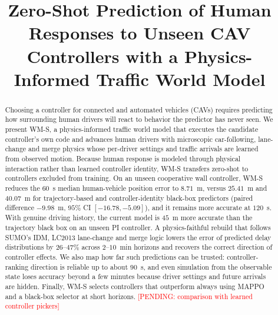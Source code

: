 \documentclass[conference]{IEEEtran}
\title{Zero-Shot Prediction of Human Responses to Unseen CAV Controllers with a Physics-Informed Traffic World Model}
\author{\IEEEauthorblockN{Author names to be supplied}
\IEEEauthorblockA{Affiliations and contact details to be supplied}}
\newcommand{\pending}[1]{\textcolor{red}{[PENDING: #1]}}
\begin{document}
\maketitle
\nocite{liu_physics_wm,sheng_residual,treiber_idm,kesting_mobil,hu_gaia1,gulino_waymax,salzmann_trajectronpp,oefinger_admissibility,rahmani_survey,lopez_sumo,yu_mappo}

\begin{abstract}
Choosing a controller for connected and automated vehicles (CAVs) requires predicting how surrounding human drivers will react to behavior the predictor has never seen. We present WM-S, a physics-informed traffic world model that executes the candidate controller's own code and advances human drivers with microscopic car-following, lane-change and merge physics whose per-driver settings and traffic arrivals are learned from observed motion. Because human response is modeled through physical interaction rather than learned controller identity, WM-S transfers zero-shot to controllers excluded from training.
On an unseen cooperative wall controller, WM-S reduces the $60$~s median human-vehicle position error to $8.71$~m, versus $25.41$~m and $40.07$~m for trajectory-based and controller-identity black-box predictors (paired difference $-9.98$~m, $95\%$ CI $[-16.78,-5.09]$), and it remains more accurate at $120$~s. %
With genuine driving history, the current model is $45$~m more accurate than the trajectory black box on an unseen PI controller. %
A physics-faithful rebuild that follows SUMO's IDM, LC2013 lane-change and merge logic lowers the error of predicted delay distributions by $26$--$47\%$ across $2$--$10$~min horizons and recovers the correct direction of controller effects. %
We also map how far such predictions can be trusted: controller-ranking direction is reliable up to about $90$~s, and even simulation from the observable state loses accuracy beyond a few minutes because driver settings and future arrivals are hidden. %
Finally, WM-S selects controllers that outperform always using MAPPO and a black-box selector at short horizons. \pending{comparison with learned controller pickers}
\end{abstract}
\end{document}
